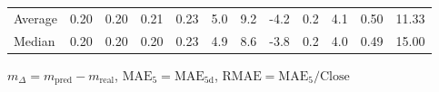 \begin{threeparttable}
{\begin{tabular}{lrrrrrrrrrrr}
Average &          0.20 &          0.20 &          0.21 &        0.23 &                 5.0 &                 9.2 &       -4.2 &                 0.2 &              4.1 &            0.50 &                  11.33 \\
 Median &          0.20 &          0.20 &          0.20 &        0.23 &                 4.9 &                 8.6 &       -3.8 &                 0.2 &              4.0 &            0.49 &                  15.00 \\
\bottomrule
\end{tabular}
}
\begin{tablenotes}\footnotesize
\item $m_\Delta=m_{\text{pred}}-m_{\text{real}}$,
$\mathrm{MAE}_5=\mathrm{MAE}_{5\text{d}}$,
$\mathrm{RMAE}=\mathrm{MAE}_5/\text{Close}$
\end{tablenotes}
\end{threeparttable}
\endgroup

